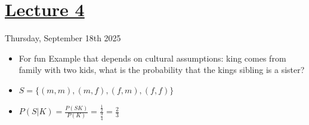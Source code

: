 \section[Lecture4]{\hyperlink{toc}{Lecture 4}}

Thursday, September 18th 2025

\begin{itemize}
    \item For fun Example that depends on cultural assumptions: king comes from family with two kids, what is the probability that the kings sibling is a sister?
    \item $S  = \{ (m,m), (m,f), (f,m), (f,f) \}$
    \item $P(S|K) = \frac{P(SK)}{P(K)} = \frac{\frac{1}{2}}{\frac{3}{4}} = \frac{2}{3}$
\end{itemize}


